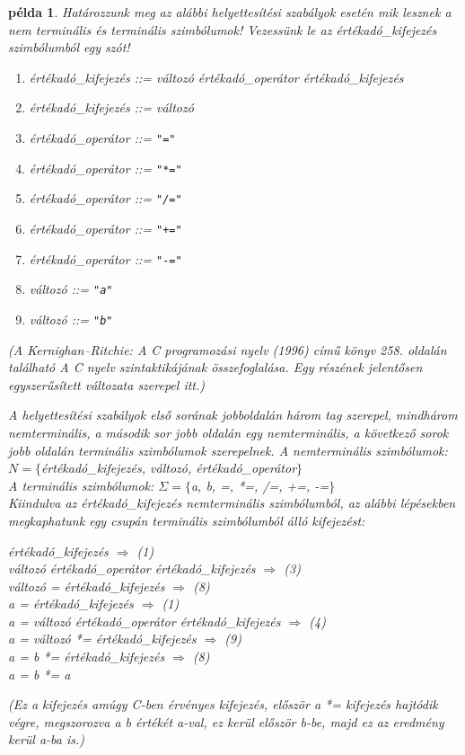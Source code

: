 \documentclass[a4paper]{article}
\newtheorem{pelda}{példa}[section]
\begin{document}
\begin{pelda}
\label{pl:c}
Határozzunk meg az alábbi helyettesítési szabályok esetén mik lesznek a
nem terminális és terminális szimbólumok!  Vezessünk le az
értékadó\_kifejezés szimbólumból egy szót!

{\it
\begin{enumerate}
\item értékadó\_kifejezés ::= változó értékadó\_operátor értékadó\_kifejezés
\item értékadó\_kifejezés ::= változó
\item értékadó\_operátor ::=  \verb|"="| 
\item értékadó\_operátor ::=  \verb|"*="|
\item értékadó\_operátor ::=  \verb|"/="|
\item értékadó\_operátor ::=  \verb|"+="|
\item értékadó\_operátor ::=  \verb|"-="|
\item változó ::= \verb|"a"|
\item változó ::= \verb|"b"|
\end{enumerate}
}

(A Kernighan--Ritchie: \emph{A C programozási nyelv} (1996) című könyv
258. oldalán található \emph{A C nyelv szintaktikájának összefoglalása}.
Egy részének jelentősen egyszerűsített változata szerepel itt.)

A helyettesítési szabályok első sorának jobboldalán három tag szerepel,
mindhárom nemterminális, a második sor jobb oldalán egy nemterminális, a
következő sorok jobb oldalán terminális szimbólumok szerepelnek. A
nemterminális szimbólumok:\\
$N=\{$értékadó\_kifejezés, változó, értékadó\_operátor$\}$\\
A terminális szimbólumok: $\Sigma=\{$a, b, =, *=, /=, +=, -=$\}$\\

Kiindulva az {\it értékadó\_kifejezés} nemterminális szimbólumból, az
alábbi lépésekben megkaphatunk egy csupán terminális szimbólumból álló
kifejezést:

{\it
\noindent
értékadó\_kifejezés   \quad$\Rightarrow$ (1)\\
változó értékadó\_operátor értékadó\_kifejezés   \quad$\Rightarrow$ (3)\\
változó = értékadó\_kifejezés   \quad$\Rightarrow$ (8)\\
a = értékadó\_kifejezés   \quad$\Rightarrow$ (1)\\
a = változó értékadó\_operátor értékadó\_kifejezés   \quad$\Rightarrow$
(4)\\
a = változó *= értékadó\_kifejezés   \quad$\Rightarrow$ (9)\\
a = b *= értékadó\_kifejezés   \quad$\Rightarrow$ (8)\\
a = b *= a\\
}

{\small
(Ez a kifejezés amúgy C-ben érvényes kifejezés, először a *= kifejezés
hajtódik végre, megszorozva a b értékét a-val, ez kerül először b-be,
majd ez az eredmény kerül a-ba is.)
}
\end{pelda}
\end{document}
